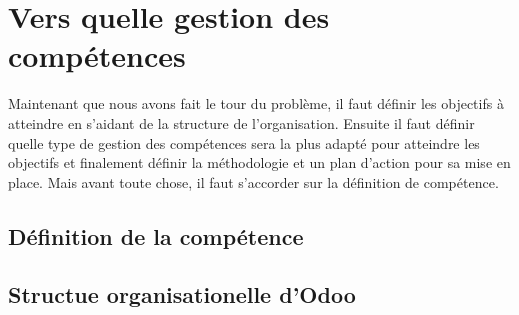 \chapter{Vers quelle gestion des compétences }
Maintenant que nous avons fait le tour du problème, il faut définir les objectifs à atteindre en s'aidant de la structure de l'organisation. Ensuite il faut définir quelle type de gestion des compétences sera la plus adapté pour atteindre les objectifs et finalement définir la méthodologie et un plan d'action pour sa mise en place. Mais avant toute chose, il faut s'accorder sur la définition de compétence. 

\section{Définition de la compétence}

\section{Structue organisationelle d'Odoo}
